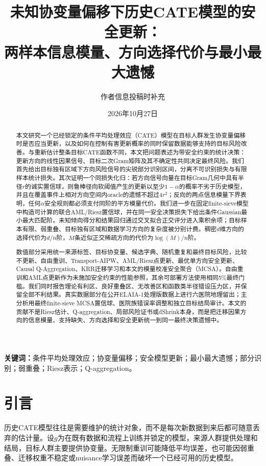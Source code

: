 \documentclass[UTF8,12pt]{ctexart}
\title{未知协变量偏移下历史CATE模型的安全更新：\\
两样本信息模量、方向选择代价与最小最大遗憾}
\author{作者信息投稿时补充}
\date{2026年10月27日}
\begin{document}
\maketitle

\begin{abstract}
本文研究一个已经锁定的条件平均处理效应（CATE）模型在目标人群发生协变量偏移时是否应当更新，以及如何在控制有害更新概率的同时保留数据能够支持的目标风险改善。与重新估计整条目标CATE函数不同，本文把问题表述为带安全约束的统计决策：更新方向的线性因果信号、目标二次Gram矩阵及其不确定性共同决定最终风险。我们首先给出目标独有区域下方向风险信号的尖锐部分识别区间，分离不可识别损失与有限样本统计损失。其次证明一个同损失化归：若方向信号向量在目标Gram几何中具有半径$r$的诚实置信球，则鲁棒径向软阈值产生的更新以至少$1-\alpha$的概率不劣于历史模型，并且在覆盖事件上相对方向空间内oracle的遗憾不超过$4r^2$；反向的两点信息模量下界表明，任何$\alpha$安全规则都必须支付同阶的平方模量代价。我们进一步在固定finite-sieve模型中构造可计算的联合AML/Riesz置信球，并在同一安全决策损失下给出条件Gaussian最小最大匹配阶。未知倾向得分和结果回归通过交叉拟合正交评分进入乘积余项；目标样本有限、弱重叠、目标独有区域和数据学习方向的复杂度被分别计费。稠密$d$维方向的选择代价为$d/n$阶，$M$条近似正交稀疏方向的代价为$\log(M)/n$阶。

数值部分采用统一来源标签、目标协变量、候选字典、随机重复和最终目标风险，比较不更新、自由重训、Transport-AIPW、AML/Riesz点更新、最优单方向安全更新、Causal Q-Aggregation、KRR迁移学习和本文的模量校准安全聚合（MCSA）。自由重训和AML点更新作为未施加安全约束的性能参照，其余可部署方法使用相同5\%最终门槛。我们同时报告理论有利区、良好重叠区、无改善区和函数类半径错设压力区，并保留全部不利结果。真实数据部分在公开ELAIA-1处理版数据上进行六医院地理留出；主分析用最终finite-sieve MCSA置信球、医院族错误率调整和独立目标结局审计。本文的贡献不是Riesz估计、Q-aggregation、局部风险证书或dShrink本身，而是把迁移因果方向的信息模量、支持缺失、方向选择和安全更新统一到同一最终决策遗憾中。
\end{abstract}

\noindent\textbf{关键词：}条件平均处理效应；协变量偏移；安全模型更新；最小最大遗憾；部分识别；弱重叠；Riesz表示；Q-aggregation。

\section{引言}
历史CATE模型往往是需要维护的统计对象，而不是每次新数据到来后都可随意丢弃的估计量。设$g$为在既有数据和流程上训练并锁定的模型，来源人群提供处理和结局，目标人群主要提供协变量。无限制重训可能降低平均误差，也可能因弱重叠、迁移权重不稳定或nuisance学习误差而破坏一个已经可用的历史模型。
\end{document}
